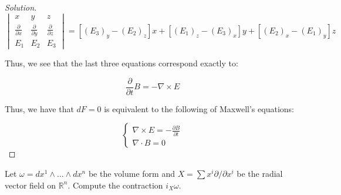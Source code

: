 \documentclass[10pt]{article}
\theoremstyle{nonumberplain}%
\newenvironment{problem}[2][]{\begin{trivlist}
\item[\hskip \labelsep {\bfseries #1}\hskip \labelsep {\bfseries #2.}]}{\end{trivlist}}
\begin{document}
\begin{proof}[Solution]
$$ \begin{vmatrix} x & y & z \\ \frac{\partial}{\partial x} & \frac{\partial}{\partial y} & \frac{\partial}{\partial z} \\ E_1 & E_2 & E_3 \end{vmatrix} = [(E_3)_y - (E_2)_z] x + [ (E_1)_z - (E_3)_x ] y + [(E_2)_x - (E_1)_y ] z $$

Thus, we see that the last three equations correspond exactly to:

$$ \frac{\partial}{\partial t} B = - \nabla \times E $$

Thus, we have that $dF = 0$ is equivalent to the following of Maxwell's equations:

$$ \begin{cases}  \nabla \times E = -\frac{\partial B}{\partial t} \\ \nabla \cdot B = 0 \end{cases} $$


\end{proof}

\begin{problem}{Question 5}

Let $\omega = dx^1 \wedge ... \wedge dx^n$ be the volume form and $X = \sum x^i \partial/ \partial x^i$ be the radial vector field on $\mathbb{R}^n$. Compute the contraction $i_X\omega$. 

\end{problem}
\end{document}
